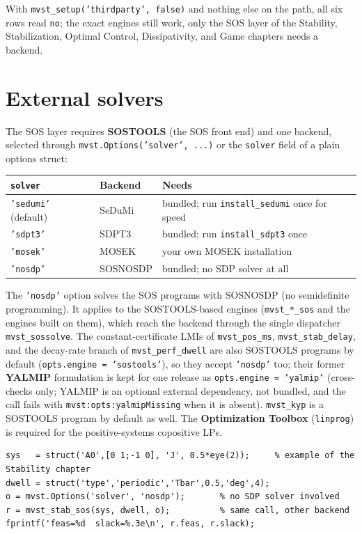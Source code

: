 \documentclass[11pt,oneside]{report}
\newcommand{\code}[1]{\texttt{#1}}
\begin{document}
With \code{mvst\_setup('thirdparty', false)} and nothing else on the path, all six
rows read \code{no}; the exact engines still work, only the SOS layer of the
Stability, Stabilization, Optimal Control, Dissipativity, and Game chapters
needs a backend.

\hypertarget{external-solvers}{%
\section{External solvers}\label{external-solvers}}

The SOS layer requires \textbf{SOSTOOLS} (the SOS front end) and one backend,
selected through \code{mvst.Options('solver', ...)} or the \code{solver} field of a plain
options struct:

\begin{longtable}[]{@{}lll@{}}
\toprule
\code{solver} & Backend & Needs \\
\midrule
\endhead
\code{'sedumi'} (default) & SeDuMi & bundled; run \code{install\_sedumi} once for speed \\
\code{'sdpt3'} & SDPT3 & bundled; run \code{install\_sdpt3} once \\
\code{'mosek'} & MOSEK & your own MOSEK installation \\
\code{'nosdp'} & SOSNOSDP & bundled; no SDP solver at all \\
\bottomrule
\end{longtable}

The \code{'nosdp'} option solves the SOS programs with SOSNOSDP (no semidefinite
programming). It applies to the SOSTOOLS-based engines (\code{mvst\_*\_sos} and the
engines built on them), which reach the backend through the single dispatcher
\code{mvst\_sossolve}. The constant-certificate LMIs of \code{mvst\_pos\_ms},
\code{mvst\_stab\_delay}, and the decay-rate branch of \code{mvst\_perf\_dwell} are also
SOSTOOLS programs by default (\code{opts.engine = 'sostools'}), so they accept
\code{'nosdp'} too; their former \textbf{YALMIP} formulation is kept for one release as
\code{opts.engine = 'yalmip'} (cross-checks only; YALMIP is an optional external
dependency, not bundled, and the call fails with \code{mvst:opts:yalmipMissing} when it is
absent). \code{mvst\_kyp} is a SOSTOOLS program by default as well. The
\textbf{Optimization Toolbox} (\code{linprog}) is required for the positive-systems
copositive LPs.

\begin{lstlisting}[style=matlabstyle]
sys   = struct('A0',[0 1;-1 0], 'J', 0.5*eye(2));     % example of the Stability chapter
dwell = struct('type','periodic','Tbar',0.5,'deg',4);
o = mvst.Options('solver', 'nosdp');       % no SDP solver involved
r = mvst_stab_sos(sys, dwell, o);          % same call, other backend
fprintf('feas=%d  slack=%.3e\n', r.feas, r.slack);
\end{lstlisting}
\end{document}
